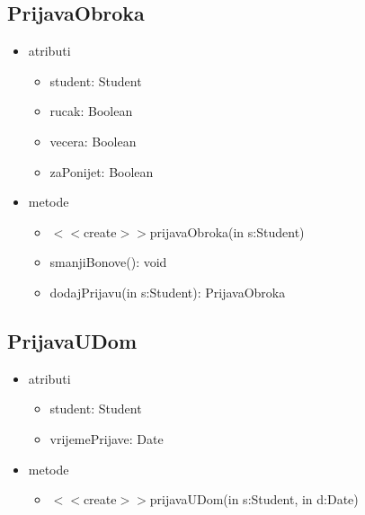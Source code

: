 \documentclass{article}
\begin{document}
\subsection*{PrijavaObroka}
\begin{itemize}
  \item atributi 
     \begin{itemize}
        \item student: Student
        \item rucak: Boolean
        \item vecera: Boolean
        \item zaPonijet: Boolean
     \end{itemize}
  \item metode
  \begin{itemize}
        \item \(<<\)create\(>>\)prijavaObroka(in s:Student)
        \item smanjiBonove(): void
        \item dodajPrijavu(in s:Student): PrijavaObroka
     \end{itemize}
\end{itemize}

\subsection*{PrijavaUDom}
\begin{itemize}
  \item atributi 
     \begin{itemize}
        \item student: Student
        \item vrijemePrijave: Date

     \end{itemize}
  \item metode
  \begin{itemize}
        \item \(<<\)create\(>>\)prijavaUDom(in s:Student, in d:Date)
     \end{itemize}
\end{itemize}
\end{document}

